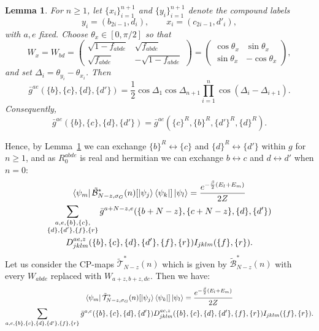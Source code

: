 \documentclass[aps,floatfix,10pt,amssymb,amsfont,amsmath,superscriptaddress,float,nofootinbib,longbibliography,nobalancelastpage,twocolumn]{revtex4-2}
\newtheorem{lemma}{Lemma}
\begin{document}
\begin{lemma}
\label{lemma:summed-history-reversal}
For $n\geq1$, let $\{x_i\}_{i=1}^{n+1}$ and $\{y_i\}_{i=1}^{n+1}$ denote
the compound labels
\begin{equation*}
    y_i=(b_{2i-1},d_i),\qquad x_i=(c_{2i-1},d'_i),
\end{equation*}
with $a,e$ fixed.  Choose $\theta_x\in[0,\pi/2]$ so that
\begin{equation*}
    W_x=W_{bd}=\begin{pmatrix}
                \sqrt{1 - f_{abde}} & \sqrt{f_{abde}}\\
       \sqrt{f_{abde}} & -\sqrt{1 - f_{abde}}
    \end{pmatrix}= \begin{pmatrix}\cos\theta_x&\sin\theta_x\\
    \sin\theta_x&-\cos\theta_x\end{pmatrix},
\end{equation*}
and set $\Delta_i=\theta_{y_i}-\theta_{x_i}$.  Then
\begin{equation}
    \bar g^{ae}(\{b\},\{c\},\{d\},\{d'\})
    =\frac12\cos\Delta_1\cos\Delta_{n+1}
      \prod_{i=1}^{n}\cos(\Delta_i-\Delta_{i+1}).
\end{equation}
Consequently,
\begin{equation}
    \bar g^{ae}(\{b\},\{c\},\{d\},\{d'\})
    =\bar g^{ae}(\{c\}^R,\{b\}^R,\{d'\}^R,\{d\}^R).
    \label{eq:PRR}
\end{equation}
\end{lemma}
Hence, by Lemma~\ref{lemma:summed-history-reversal} we can exchange $\{b\}^R \leftrightarrow \{c\}$ and $\{d\}^R \leftrightarrow \{d'\}$ within $g$ for $n\geq 1$, and as $R_0^{abde}$ is real and hermitian we can exchange $b \leftrightarrow c$ and $d \leftrightarrow d'$ when $n=0$:
\begin{multline}
         \bra{\psi_m}\tilde{\mathcal{B}}^*_{N-z,\sigma_G}(n)[\ket{\psi_j}\bra{\psi_k}]\ket{\psi_l} = \frac{e^{-\frac{\beta}{2}(E_l+E_m)}}{2Z}\\\sum_{\substack{a,e,\{b\},\{c\},\\\{d\},\{d'\},\{f\},\{r\}}} \bar g^{a+N -z,e}(\{b+N -z\},\{c+N -z\},\{d\},\{d'\}) 
         \\D^{ae,z}_{jklm}(\{b\},\{c\},\{d\},\{d'\},\{f\},\{r\})I_{jklm}(\{f\},\{r\}).  
    \label{eq:relabelline-first}
\end{multline}
Let us consider the CP-maps $\tilde{\mathcal{T}}^*_{N-z}(n)$ which is given by $\tilde{\mathcal{B}}^*_{N-z}(n)$ with every $W_{abde}$ replaced with $W_{a+z,b+z,de}$. Then we have:
\begin{multline}
         \bra{\psi_m}\tilde{\mathcal{T}}^*_{N -z,\sigma_G}(n)[\ket{\psi_j}\bra{\psi_k}]\ket{\psi_l} = \frac{e^{-\frac{\beta}{2}(E_l+E_m)}}{2Z}\\\sum_{a,e,\{b\},\{c\},\{d\},\{d'\},\{f\},\{r\}} \bar g^{a,e}(\{b\},\{c\},\{d\},\{d'\}) D^{ae,z}_{jklm}(\{b\},\{c\},\{d\},\{d'\},\{f\},\{r\})I_{jklm}(\{f\},\{r\}).
     \label{eq:relabelline-symmetrized}
\end{multline}
\end{document}
